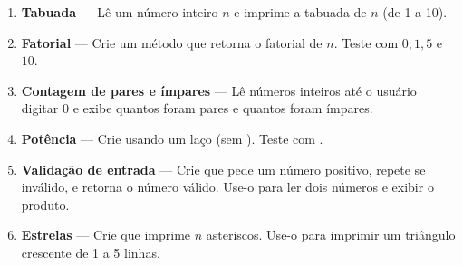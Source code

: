 \documentclass[11pt,a4paper]{article}
\begin{document}
\begin{enumerate}
  \item \textbf{Tabuada} — Lê um número inteiro \(n\) e imprime a tabuada de \(n\) (de 1 a 10).

  \item \textbf{Fatorial} — Crie um método  que retorna o fatorial de \(n\). Teste com \(0, 1, 5\) e \(10\).

  \item \textbf{Contagem de pares e ímpares} — Lê números inteiros até o usuário digitar \(0\) e exibe quantos foram pares e quantos foram ímpares.

  \item \textbf{Potência} — Crie  usando um laço (sem ). Teste com .

  \item \textbf{Validação de entrada} — Crie  que pede um número positivo, repete se inválido, e retorna o número válido. Use-o para ler dois números e exibir o produto.

  \item \textbf{Estrelas} — Crie  que imprime \(n\) asteriscos. Use-o para imprimir um triângulo crescente de 1 a 5 linhas.
\end{enumerate}
\end{document}
